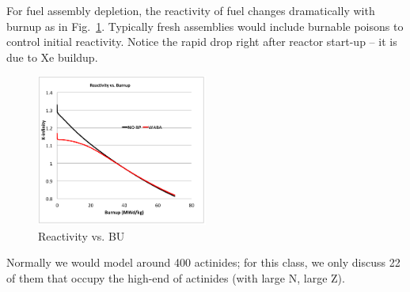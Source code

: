 \documentclass{school-22.211-notes}
\date{April 11, 2012}
\begin{document}
\maketitle

 \label{fuel-depletion}
For fuel assembly depletion, the reactivity of fuel changes dramatically with burnup as in Fig.~\ref{rho-vs-BU}. Typically fresh assemblies would include burnable poisons to control initial reactivity. Notice the rapid drop right after reactor start-up -- it is due to Xe buildup. 

\begin{figure}[h]
  \centering
  \includegraphics[width=0.5\textwidth]{images/dfs/rho-vs-BU.png}
  \caption{Reactivity vs. BU} \label{rho-vs-BU}
\end{figure}

Normally we would model around 400 actinides; for this class, we only discuss 22 of them that occupy the high-end of actinides (with large N, large Z). 
\end{document}
